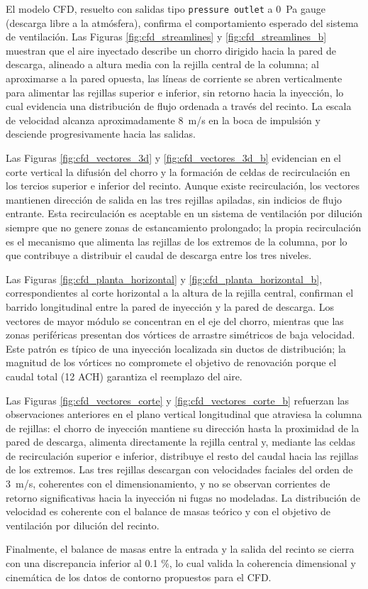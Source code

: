 El modelo CFD, resuelto con salidas tipo \texttt{pressure outlet} a \SI{0}{Pa} gauge (descarga libre a la atmósfera), confirma el comportamiento esperado del sistema de ventilación. Las Figuras \ref{fig:cfd_streamlines} y \ref{fig:cfd_streamlines_b} muestran que el aire inyectado describe un chorro dirigido hacia la pared de descarga, alineado a altura media con la rejilla central de la columna; al aproximarse a la pared opuesta, las líneas de corriente se abren verticalmente para alimentar las rejillas superior e inferior, sin retorno hacia la inyección, lo cual evidencia una distribución de flujo ordenada a través del recinto. La escala de velocidad alcanza aproximadamente \SI{8}{m/s} en la boca de impulsión y desciende progresivamente hacia las salidas.

Las Figuras \ref{fig:cfd_vectores_3d} y \ref{fig:cfd_vectores_3d_b} evidencian en el corte vertical la difusión del chorro y la formación de celdas de recirculación en los tercios superior e inferior del recinto. Aunque existe recirculación, los vectores mantienen dirección de salida en las tres rejillas apiladas, sin indicios de flujo entrante. Esta recirculación es aceptable en un sistema de ventilación por dilución siempre que no genere zonas de estancamiento prolongado; la propia recirculación es el mecanismo que alimenta las rejillas de los extremos de la columna, por lo que contribuye a distribuir el caudal de descarga entre los tres niveles.

Las Figuras \ref{fig:cfd_planta_horizontal} y \ref{fig:cfd_planta_horizontal_b}, correspondientes al corte horizontal a la altura de la rejilla central, confirman el barrido longitudinal entre la pared de inyección y la pared de descarga. Los vectores de mayor módulo se concentran en el eje del chorro, mientras que las zonas periféricas presentan dos vórtices de arrastre simétricos de baja velocidad. Este patrón es típico de una inyección localizada sin ductos de distribución; la magnitud de los vórtices no compromete el objetivo de renovación porque el caudal total (12 ACH) garantiza el reemplazo del aire.

Las Figuras \ref{fig:cfd_vectores_corte} y \ref{fig:cfd_vectores_corte_b} refuerzan las observaciones anteriores en el plano vertical longitudinal que atraviesa la columna de rejillas: el chorro de inyección mantiene su dirección hasta la proximidad de la pared de descarga, alimenta directamente la rejilla central y, mediante las celdas de recirculación superior e inferior, distribuye el resto del caudal hacia las rejillas de los extremos. Las tres rejillas descargan con velocidades faciales del orden de \SI{3}{m/s}, coherentes con el dimensionamiento, y no se observan corrientes de retorno significativas hacia la inyección ni fugas no modeladas. La distribución de velocidad es coherente con el balance de masas teórico y con el objetivo de ventilación por dilución del recinto.

Finalmente, el balance de masas entre la entrada y la salida del recinto se cierra con una discrepancia inferior al 0.1 \%, lo cual valida la coherencia dimensional y cinemática de los datos de contorno propuestos para el CFD.
